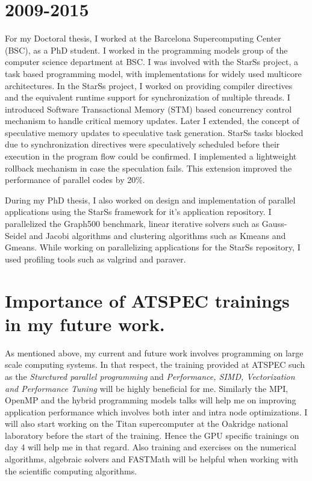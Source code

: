 \documentclass[margin]{res}
\begin{document}
\section{2009-2015}
 For my Doctoral thesis, I worked at the Barcelona Supercomputing Center (BSC), as a PhD student.
 I worked in the programming models group of the computer science department at BSC.
 I was involved with the StarSs project, a task based programming model, with implementations for widely used multicore architectures.
 In the StarSs project, I worked on providing compiler directives and the equivalent runtime support for synchronization of multiple threads.
 I introduced Software Transactional Memory (STM) based concurrency control mechanism to handle critical memory updates.
 Later I extended, the concept of speculative memory updates to speculative task generation.
 StarSs tasks blocked due to synchronization directives were speculatively scheduled before their execution in the program flow could be confirmed.
 I implemented a lightweight rollback mechanism in case the speculation fails.
 This extension improved the performance of parallel codes by 20\%.

 During my PhD thesis, I also worked on design and implementation of parallel applications using the StarSs framework for it's application repository.
 I parallelized the Graph500 benchmark, linear iterative solvers such as Gauss-Seidel and Jacobi algorithms and clustering algorithms such as Kmeans and Gmeans.
 While working on parallelizing applications for the StarSs repository, I used profiling tools such as valgrind and paraver.
%
%
\section{Importance of ATSPEC trainings in my future work.}
As mentioned above, my current and future work involves programming on large scale computing systems.
In that respect, the training provided at ATSPEC such as the \textit{Sturctured parallel programming} and \textit{Performance, SIMD, Vectorization and Performance Tuning}
will be highly beneficial for me.
Similarly the MPI, OpenMP and the hybrid programming models talks will help me on improving application performance which involves both inter and intra node optimizations.
I will also start working on the Titan supercomputer at the Oakridge national laboratory before the start of the training.
Hence the GPU specific trainings on day 4 will help me in that regard.
Also training and exercises on the numerical algorithms, algebraic solvers and FASTMath will be helpful when working with the scientific computing algorithms.
\end{document}
